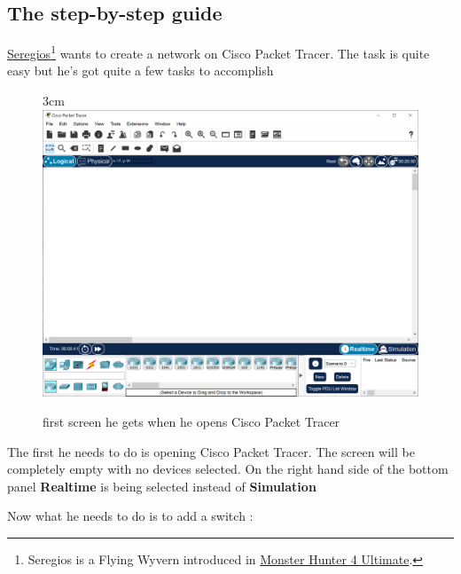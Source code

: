 \documentclass[a4paper,12pt]{book}
\begin{document}
\clearpage

\subsection{The step-by-step guide}

\href{https://monsterhunter.fandom.com/wiki/Seregios}{Seregios}\footnote{\label{seregios}Seregios is a Flying Wyvern introduced in \href{https://monsterhunter.fandom.com/wiki/Monster_Hunter_4_Ultimate}{Monster Hunter 4 Ultimate}.} wants to create a network on Cisco Packet Tracer. The task is quite easy but he's got quite a few tasks to accomplish

\begin{figure}{3cm}
\centering
\includegraphics[width=13cm]{./step-by-step/0.PNG}
\caption{first screen he gets when he opens Cisco Packet Tracer}\label{wrap-fig:100}
\end{figure}

The first he needs to do is opening Cisco Packet Tracer. The screen will be completely empty with no devices selected. On the right hand side of the bottom panel \textbf{Realtime} is being selected instead of \textbf{Simulation} \newline

\clearpage

\noindent Now what he needs to do is to add a switch : \newline
\end{document}
